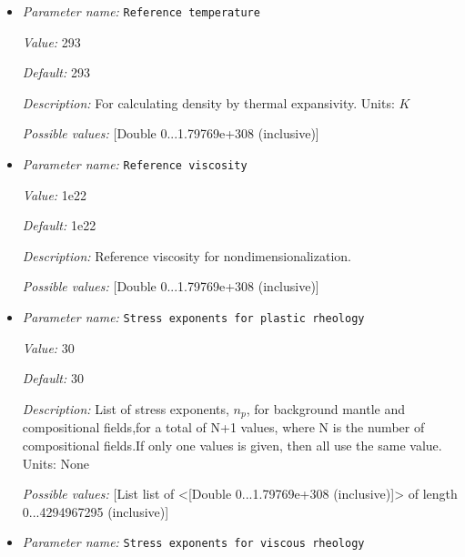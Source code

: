 \begin{itemize}
{\it Default:} 6.4e-16


{\it Description:} ($\dot{\varepsilon}_{ref}$). Units: $1 / s$


{\it Possible values:} [Double 0...1.79769e+308 (inclusive)]
\item {\it Parameter name:} {\tt Reference temperature}
\label{parameters:Material model/Morency and Doin/Reference temperature}


{\it Value:} 293


{\it Default:} 293


{\it Description:} For calculating density by thermal expansivity. Units: $K$


{\it Possible values:} [Double 0...1.79769e+308 (inclusive)]
\item {\it Parameter name:} {\tt Reference viscosity}
\label{parameters:Material model/Morency and Doin/Reference viscosity}


{\it Value:} 1e22


{\it Default:} 1e22


{\it Description:} Reference viscosity for nondimensionalization.


{\it Possible values:} [Double 0...1.79769e+308 (inclusive)]
\item {\it Parameter name:} {\tt Stress exponents for plastic rheology}
\label{parameters:Material model/Morency and Doin/Stress exponents for plastic rheology}


{\it Value:} 30


{\it Default:} 30


{\it Description:} List of stress exponents, $n_p$, for background mantle and compositional fields,for a total of N+1 values, where N is the number of compositional fields.If only one values is given, then all use the same value.  Units: None


{\it Possible values:} [List list of <[Double 0...1.79769e+308 (inclusive)]> of length 0...4294967295 (inclusive)]
\item {\it Parameter name:} {\tt Stress exponents for viscous rheology}
\label{parameters:Material model/Morency and Doin/Stress exponents for viscous rheology}



\end{itemize}
